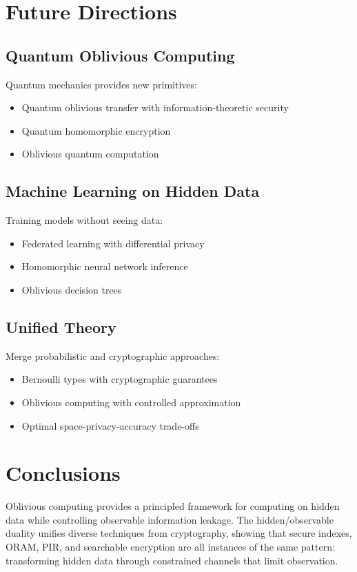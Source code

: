 \documentclass[11pt,final,hidelinks]{article}
\begin{document}
\section{Future Directions}

\subsection{Quantum Oblivious Computing}

Quantum mechanics provides new primitives:
\begin{itemize}
    \item Quantum oblivious transfer with information-theoretic security
    \item Quantum homomorphic encryption
    \item Oblivious quantum computation
\end{itemize}

\subsection{Machine Learning on Hidden Data}

Training models without seeing data:
\begin{itemize}
    \item Federated learning with differential privacy
    \item Homomorphic neural network inference
    \item Oblivious decision trees
\end{itemize}

\subsection{Unified Theory}

Merge probabilistic and cryptographic approaches:
\begin{itemize}
    \item Bernoulli types with cryptographic guarantees
    \item Oblivious computing with controlled approximation
    \item Optimal space-privacy-accuracy trade-offs
\end{itemize}

\section{Conclusions}

Oblivious computing provides a principled framework for computing on hidden data while controlling observable information leakage. The hidden/observable duality unifies diverse techniques from cryptography, showing that secure indexes, ORAM, PIR, and searchable encryption are all instances of the same pattern: transforming hidden data through constrained channels that limit observation.
\end{document}
